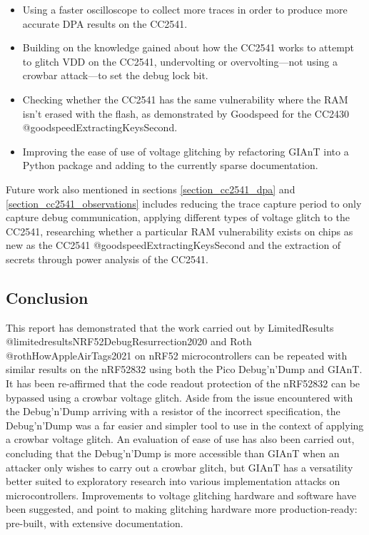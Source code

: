 \begin{itemize}
\tightlist
\item
  Using a faster oscilloscope to collect more traces in order to produce
  more accurate DPA results on the CC2541.
\item
  Building on the knowledge gained about how the CC2541 works to attempt
  to glitch VDD on the CC2541, undervolting or overvolting---not using a
  crowbar attack---to set the debug lock bit.
\item
  Checking whether the CC2541 has the same vulnerability where the RAM
  isn't erased with the flash, as demonstrated by Goodspeed for the
  CC2430 @goodspeedExtractingKeysSecond.
\item
  Improving the ease of use of voltage glitching by refactoring GIAnT
  into a Python package and adding to the currently sparse
  documentation.
\end{itemize}

Future work also mentioned in sections \ref{section_cc2541_dpa} and
\ref{section_cc2541_observations} includes reducing the trace capture
period to only capture debug communication, applying different types of
voltage glitch to the CC2541, researching whether a particular RAM
vulnerability exists on chips as new as the CC2541
@goodspeedExtractingKeysSecond and the extraction of secrets through
power analysis of the CC2541.

\hypertarget{conclusion}{%
\subsection{Conclusion}\label{conclusion}}

This report has demonstrated that the work carried out by LimitedResults
@limitedresultsNRF52DebugResurrection2020 and Roth
@rothHowAppleAirTags2021 on nRF52 microcontrollers can be repeated with
similar results on the nRF52832 using both the Pico Debug'n'Dump and
GIAnT. It has been re-affirmed that the code readout protection of the
nRF52832 can be bypassed using a crowbar voltage glitch. Aside from the
issue encountered with the Debug'n'Dump arriving with a resistor of the
incorrect specification, the Debug'n'Dump was a far easier and simpler
tool to use in the context of applying a crowbar voltage glitch. An
evaluation of ease of use has also been carried out, concluding that the
Debug'n'Dump is more accessible than GIAnT when an attacker only wishes
to carry out a crowbar glitch, but GIAnT has a versatility better suited
to exploratory research into various implementation attacks on
microcontrollers. Improvements to voltage glitching hardware and
software have been suggested, and point to making glitching hardware
more production-ready: pre-built, with extensive documentation.


